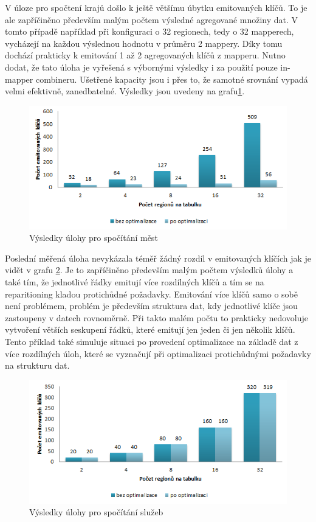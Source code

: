\documentclass[thesis=M,czech]{FITthesis}[2012/06/26]
\begin{document}
V úloze pro spočtení krajů došlo k ještě většímu úbytku emitovaných klíčů. To je ale zapříčiněno především malým počtem výsledné agregované množiny dat. V tomto případě například při konfiguraci o 32 regionech, tedy o 32 mapperech, vycházejí na každou výslednou hodnotu v průměru 2 mappery. Díky tomu dochází prakticky k emitování 1 až 2 agregovaných klíčů z mapperu. Nutno dodat, že tato úloha je vyřešená s výbornými výsledky i za použití pouze in-mapper combineru. Ušetřené kapacity jsou i přes to, že samotné srovnání vypadá velmi efektivně, zanedbatelné. Výsledky jsou uvedeny na grafu\ref{fig:kraje}. 
\begin{figure}[h]\centering
	\includegraphics[width=1\textwidth, angle=0]{files/kraje}
	\caption[Výsledky úlohy pro spočítání krajů]
	{Výsledky úlohy pro spočítání měst}\label{fig:kraje}
\end{figure}
Poslední měřená úloha nevykázala téměř žádný rozdíl v emitovaných klíčích jak je vidět v grafu \ref{fig:sluzby}. Je to zapříčiněno především malým počtem výsledků úlohy a také tím, že jednotlivé řádky emitují více rozdílných klíčů a tím se na reparitioning kladou protichůdné požadavky. Emitování více klíčů samo o sobě není problémem, problém je především struktura dat, kdy jednotlivé klíče jsou zastoupeny v datech rovnoměrně. Při takto malém počtu to prakticky nedovoluje vytvoření větších seskupení řádků, které emitují jen jeden či jen několik klíčů. Tento příklad také simuluje situaci po provedení optimalizace na základě dat z více rozdílných úloh, které se vyznačují při optimalizaci protichůdnými požadavky na strukturu dat.
\begin{figure}[h]\centering
	\includegraphics[width=1\textwidth, angle=0]{files/sluzby}
	\caption[Výsledky úlohy pro spočítání služeb]
	{Výsledky úlohy pro spočítání služeb}\label{fig:sluzby}
\end{figure}
\end{document}
